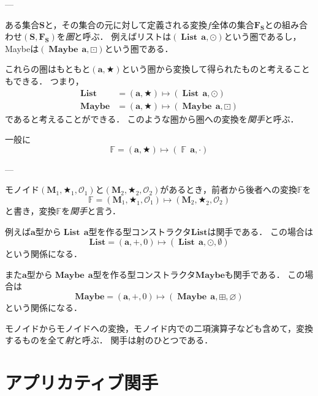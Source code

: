 \documentclass[twocolumn]{jsbook}
\newcommand{\keyword}[1]{\emph{#1}}
\newcommand{\typename}[1]{\mathbf{#1}}
\newcommand{\typeconstructor}[2]{\mathop{#1}\,#2}
\newcommand{\typelist}{\typename{List}}
\newcommand{\typemaybe}{\typename{Maybe}}
\newcommand{\constantempty}{\emptyset}
\newcommand{\constantnothing}{\varnothing}
\newcommand{\binaryfunctormap}{\cdot}
\newcommand{\binarylistfunctormap}{\odot}
\newcommand{\binarymaybefunctormap}{\boxdot}
\newcommand{\binarymaybeappend}{\boxplus}
\newcommand{\mathbinaryop}{\bigstar}
\newcommand{\mathidentity}{\mathcal{O}}
\newcommand{\mathsetname}[1]{\boldsymbol{#1}}
\newcommand{\mathfunctorname}[1]{\mathbb{#1}}
\begin{document}
---

ある集合$\mathsetname{S}$と，その集合の元に対して定義される変換$f$全体の集合$\mathsetname{F}_{\mathsetname{S}}$との組み合わせ$(\mathsetname{S},\mathsetname{F}_{\mathsetname{S}})$を\keyword{圏}と呼ぶ．
例えばリストは$(\typeconstructor{\typelist}{\typename{a}},\binarylistfunctormap)$という圏であるし，Maybeは$(\typeconstructor{\typemaybe}{\typename{a}},\binarymaybefunctormap)$という圏である．

これらの圏はもともと$(\typename{a},\mathbinaryop)$という圏から変換して得られたものと考えることもできる．
つまり，
\begin{align*}
\typelist&=(\typename{a},\mathbinaryop)\mapsto(\typeconstructor{\typelist}{\typename{a}},\binarylistfunctormap)\\
\typemaybe&=(\typename{a},\mathbinaryop)\mapsto(\typeconstructor{\typemaybe}{\typename{a}},\binarymaybefunctormap)
\end{align*}
であると考えることができる．
このような圏から圏への変換を\keyword{関手}と呼ぶ．

一般に$$\mathfunctorname{F}=(\mathsetname{a},\mathbinaryop)\mapsto(\typeconstructor{\mathfunctorname{F}}{\typename{a}},\binaryfunctormap)$$


---

モノイド$(\mathsetname{M}_1,\mathbinaryop_1,\mathidentity_1)$と$(\mathsetname{M}_2,\mathbinaryop_2,\mathidentity_2)$があるとき，前者から後者への変換$\mathfunctorname{F}$を$$\mathfunctorname{F}=(\mathsetname{M}_1,\mathbinaryop_1,\mathidentity_1)\mapsto (\mathsetname{M}_2,\mathbinaryop_2,\mathidentity_2)$$と書き，変換$\mathfunctorname{F}$を\keyword{関手}と言う．

例えば$\typename{a}$型から$\typeconstructor{\typelist}{\typename{a}}$型を作る型コンストラクタ$\typelist$は関手である．
この場合は$$\typelist=(\typename{a},+,0)\mapsto(\typeconstructor{\typelist}{\typename{a}},\binarylistfunctormap,\constantempty)$$という関係になる．

また$\typename{a}$型から$\typeconstructor{\typemaybe}{\typename{a}}$型を作る型コンストラクタ$\typemaybe$も関手である．
この場合は$$\typemaybe=(\typename{a},+,0)\mapsto(\typeconstructor{\typemaybe}{\typename{a}},\binarymaybeappend,\constantnothing)$$という関係になる．


モノイドからモノイドへの変換，モノイド内での二項演算子なども含めて，変換するものを全て\keyword{射}と呼ぶ．
関手は射のひとつである．



\section{アプリカティブ関手}
\end{document}
